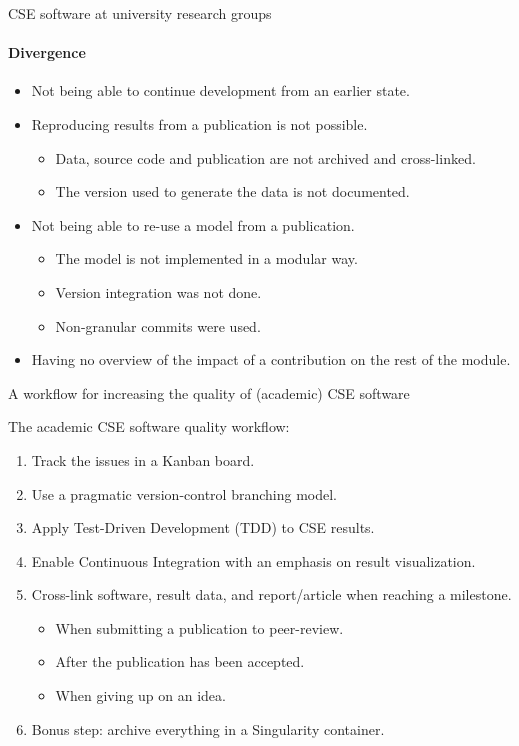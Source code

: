 \documentclass[
	ngerman,%
	aspectratio=169,%
	color={accentcolor=2d},
	logo=true,%
	colorframetitle=true,%
	]{tudabeamer}
\begin{document}
\begin{frame}{CSE software at university research groups}
	\framesubtitle{Divergence}
	
	\vfill
	\begin{itemize}
		\item Not being able to continue development from an earlier state.
		\item Reproducing results from a publication is not possible.  
			\begin{itemize}
				\item Data, source code and publication are not archived and cross-linked. 
				\item The version used to generate the data is not documented. 
			\end{itemize}
		\item Not being able to re-use a model from a publication. 
			\begin{itemize}
				\item The model is not implemented in a modular way.
				\item Version integration was not done.
				\item Non-granular commits were used. 
			\end{itemize}
		\item Having no overview of the impact of a contribution on the rest of the module.
	\end{itemize}

	\medskip

\end{frame}

\begin{frame}{A workflow for increasing the quality of (academic) CSE software} 

	\vfill
	The academic CSE software quality workflow: 
	\begin{enumerate}
		\item Track the issues in a Kanban board.
		\item Use a pragmatic version-control branching model. 
		\item Apply Test-Driven Development (TDD) to CSE results.  
		\item Enable Continuous Integration with an emphasis on result visualization. 
		\item Cross-link software, result data, and report/article when reaching a milestone.
			\begin{itemize}
				\item When submitting a publication to peer-review. 
				\item After the publication has been accepted. 
				\item When giving up on an idea. 
			\end{itemize}
		\item Bonus step: archive everything in a Singularity container.
	\end{enumerate}

\end{frame}
\end{document}
